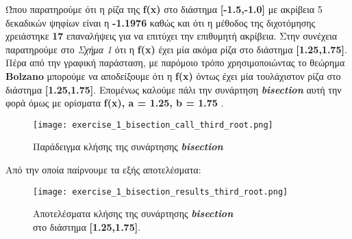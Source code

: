 \documentclass[First Project.tex]{subfiles}
\begin{document}
Ώπου παρατηρούμε ότι η ρίζα της \textlatin{\textbf{f(x)}} στο διάστημα \textlatin{\textbf{[-1.5,-1.0]}} με ακρίβεια 5 δεκαδικών ψηφίων 
είναι η \textbf{-1.1976} καθώς και ότι η μέθοδος της διχοτόμησης χρειάστηκε \textbf{17} επαναλήψεις για να επιτύχει την επιθυμητή ακρίβεια.
Στην συνέχεια παρατηρούμε στο \textit{Σχήμα 1} ότι η \textlatin{\textbf{f(x)}} έχει μία ακόμα ρίζα στο διάστημα \textlatin{\textbf{[1.25,1.75]}}.
Πέρα από την γραφική παράσταση, με παρόμοιο τρόπο χρησιμοποιώντας το θεώρημα \textlatin{\textbf{Bolzano}} μπορούμε να αποδείξουμε ότι η
\textlatin{\textbf{f(x)}} όντως έχει μία τουλάχιστον ρίζα στο διάστημα \textlatin{\textbf{[1.25,1.75]}}. Επομένως καλούμε πάλι την συνάρτηση
\textit{\textlatin{\textbf{bisection}}} αυτή την φορά όμως με ορίσματα \textlatin{\textbf{f(x), a = 1.25, b = 1.75 }}.
\vspace{5px}
\begin{figure}[h!]
    \centering
    \captionsetup{justification=centering}
    \begin{center}
        \texttt{[image: exercise\_1\_bisection\_call\_third\_root.png]}    
        \caption{Παράδειγμα κλήσης της συνάρτησης \textit{\textlatin{\textbf{bisection}}}}
    \end{center}
\end{figure}

Από την οποία παίρνουμε τα εξής αποτελέσματα:
\begin{figure}[h!]
    \centering
    \captionsetup{justification=centering}
    \begin{center}
    \texttt{[image: exercise\_1\_bisection\_results\_third\_root.png]}    
    \caption{ Αποτελέσματα κλήσης της συνάρτησης \textit{\textlatin{\textbf{bisection}}} \\ στο διάστημα \textlatin{\textbf{[1.25,1.75]}}. }
    \end{center}
\end{figure}
\end{document}
